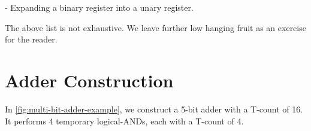 \documentclass[twocolumn,longbibliography]{quantumarticle-customized}
\begin{document}
- Expanding a binary register into a unary register.

The above list is not exhaustive.
We leave further low hanging fruit as an exercise for the reader.


\section{Adder Construction}
\label{sec:construction}

In \autoref{fig:multi-bit-adder-example}, we construct a 5-bit adder with a T-count of 16.
It performs 4 temporary logical-ANDs, each with a T-count of 4.

\begin{figure}
\end{figure}
\end{document}
